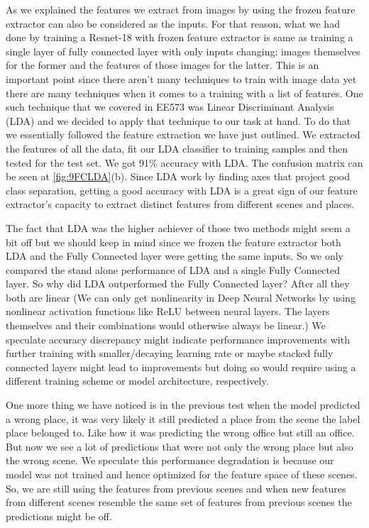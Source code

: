 \documentclass[11pt]{article}
\begin{document}
As we explained the features we extract from images by using the frozen feature extractor can also be considered as the inputs. For that reason, what we had done by training a Resnet-18 with frozen feature extractor is same as training a single layer of fully connected layer with only inputs changing: images themselves for the former and the features of those images for the latter. This is an important point since there aren’t many techniques to train with image data yet there are many techniques when it comes to a training with a list of features. One such technique that we covered in EE573 was Linear Discriminant Analysis (LDA) and we decided to apply that technique to our task at hand. To do that we essentially followed the feature extraction we have just outlined. We extracted the features of all the data, fit our LDA classifier to training samples and then tested for the test set. We got 91\% accuracy with LDA. The confusion matrix can be seen at \ref{fig:9FCLDA}{(b)}. Since LDA work by finding axes that project good class separation, getting a good accuracy with LDA is a great sign of our feature extractor’s capacity to extract distinct features from different scenes and places.

The fact that LDA was the higher achiever of those two methods might seem a bit off but we should keep in mind since we frozen the feature extractor both LDA and the Fully Connected layer were getting the same inputs. So we only compared the stand alone performance of LDA and a single Fully Connected layer. So why did LDA outperformed the Fully Connected layer? After all they both are linear (We can only get nonlinearity in Deep Neural Networks by using nonlinear activation functions like ReLU between neural layers. The layers themselves and their combinations would otherwise always be linear.) We speculate accuracy discrepancy might indicate performance improvements with further training with smaller/decaying learning rate or maybe stacked fully connected layers might lead to improvements but doing so would require using a different training scheme or model architecture, respectively. 

One more thing we have noticed is in the previous test when the model predicted a wrong place, it was very likely it still predicted a place from the scene the label place belonged to. Like how it was predicting the wrong office but still an office. But now we see a lot of predictions that were not only the wrong place but also the wrong scene. We speculate this performance degradation is because our model was not trained and hence optimized for the feature space of these scenes. So, we are still using the features from previous scenes and when new features from different scenes resemble the same set of features from previous scenes the predictions might be off. 
\end{document}
